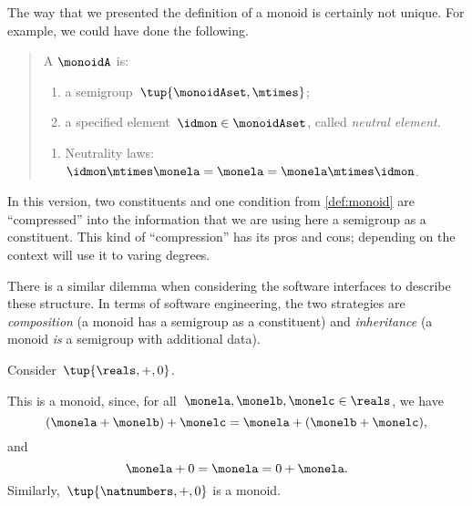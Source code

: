 \begin{remark}
    The way that we presented the definition of a monoid is certainly not unique.
    For example, we could have done the following.
    \begin{quote}
        A \emph{} $\monoidA$ is:
        \begin{body}
            \constit
            \begin{enumerate}
                \item a semigroup~$\tup{\monoidAset, \mtimes}$;
                \item a specified element~$\idmon\in \monoidAset$, called \emph{neutral element}.
            \end{enumerate}
            \condit
            \begin{enumerate}
                \item Neutrality laws:~$\idmon\mtimes \monela= \monela= \monela \mtimes \idmon$.
            \end{enumerate}
        \end{body}
    \end{quote}
    In this version, two constituents and one condition from \cref{def:monoid} are ``compressed'' into the information that we are using here a semigroup as a constituent.
    This kind of ``compression'' has its pros and cons; depending on the context will use it to varing degrees.
    
    There is a similar dilemma when considering the software interfaces to describe these structure.
    In terms of software engineering, the two strategies are \emph{composition} (a monoid has a semigroup as a constituent) and \emph{inheritance} (a monoid \emph{is} a semigroup with additional data).

\end{remark}



\begin{example}
    Consider~$\tup{\reals,+,0}$.
    
    This is a monoid, since, for all~$\monela,\monelb, \monelc \in \reals$, we have
    \begin{equation*}
    (\monela+\monelb)
        +\monelc=\monela+(\monelb+\monelc),
    \end{equation*}
    and
    \begin{equation*}
        \monela+0=\monela=0+\monela.
    \end{equation*}
    Similarly,~$\tup{\natnumbers, +,0}$ is a monoid.
\end{example}

